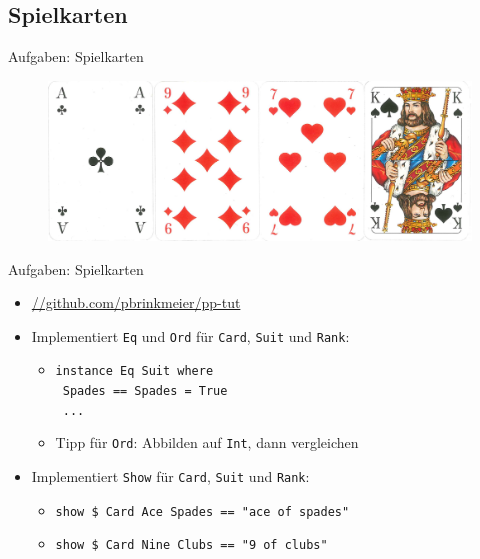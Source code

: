 \documentclass{beamer}
\newcommand{\code}[1]{
	\begin{mdframed}
		
	\end{mdframed}
}
\begin{document}
\subsection{Spielkarten}

\begin{frame}{Aufgaben: Spielkarten}
	\begin{figure}
		\includegraphics[width=\textwidth]{images/playing-cards}
	\end{figure}

	\code{demos/PlayingCards.hs}
\end{frame}

\begin{frame}{Aufgaben: Spielkarten}
	\code{demos/PlayingCards.hs}

	\begin{itemize}
		\item \url{//github.com/pbrinkmeier/pp-tut}
		\item Implementiert \texttt{Eq} und \texttt{Ord} für \texttt{Card}, \texttt{Suit} und \texttt{Rank}:
		\begin{itemize}
			\item \texttt{instance Eq Suit where}\\\texttt{  Spades == Spades = True}\\\texttt{  ...}
			\item Tipp für \texttt{Ord}: Abbilden auf \texttt{Int}, dann vergleichen
		\end{itemize}
		\pause
		\item Implementiert \texttt{Show} für \texttt{Card}, \texttt{Suit} und \texttt{Rank}:
		\begin{itemize}
			\item \texttt{show \$ Card Ace Spades == "{}ace of spades"{}}
			\item \texttt{show \$ Card Nine Clubs == "{}9 of clubs"{}}
		\end{itemize}
	\end{itemize}
\end{frame}
\end{document}

